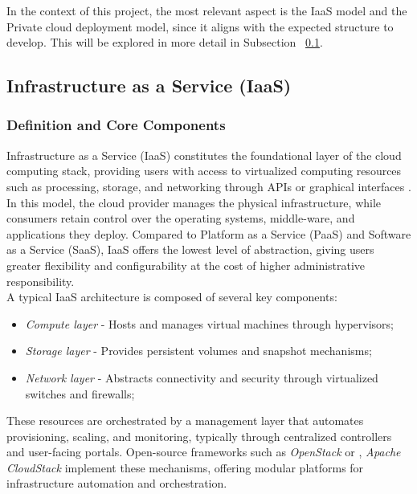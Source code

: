 \documentclass[sigplan]{acmart}
\begin{document}
        In the context of this project, the most relevant aspect is the IaaS model and the Private cloud deployment model, since it aligns with the expected structure to develop. This will be explored in more detail in Subsection ~\ref{sec:background.iaas}.

    \subsection{Infrastructure as a Service (IaaS)} \label{sec:background.iaas}
    
        \subsubsection{Definition and Core Components}
            Infrastructure as a Service (IaaS) constitutes the foundational layer of the cloud computing stack, providing users with access to virtualized computing resources such as processing, storage, and networking through APIs or graphical interfaces \cite{mellNISTDefinitionCloud}. In this model, the cloud provider manages the physical infrastructure, while consumers retain control over the operating systems, middle-ware, and applications they deploy. Compared to Platform as a Service (PaaS) and Software as a Service (SaaS), IaaS offers the lowest level of abstraction, giving users greater flexibility and configurability at the cost of higher administrative responsibility.\\
            
            A typical IaaS architecture is composed of several key components:
            \begin{itemize}
                \item \textit{Compute layer} - Hosts and manages virtual machines through hypervisors;
                \item \textit{Storage layer} - Provides persistent volumes and snapshot mechanisms;
                \item \textit{Network layer} - Abstracts connectivity and security through virtualized switches and firewalls;
            \end{itemize}
            
            These resources are orchestrated by a management layer that automates provisioning, scaling, and monitoring, typically through centralized controllers and user-facing portals. Open-source frameworks such as \textit{OpenStack} or \cite{openstack_software}, \textit{Apache CloudStack} \cite{IntroductionApacheCloudStack} implement these mechanisms, offering modular platforms for infrastructure automation and orchestration.\\
            
\end{document}
